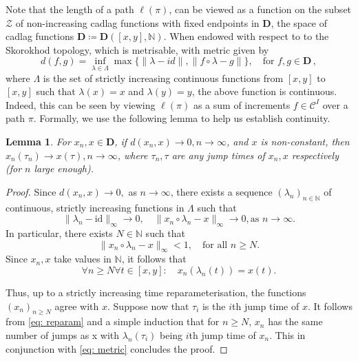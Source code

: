 \documentclass[12pt]{report}
\theoremstyle{plain}
\newtheorem{lemma}[theorem]{Lemma}
\newcommand{\N}{\ensuremath{\mathbb{N}}}
\begin{document}
Note that the length of a path \(\ell(\pi)\), can be viewed as a function on the subset \(\mathcal{Z}\) of non-increasing cadlag functions with fixed endpoints in \(\mathbf{D}\), the space of cadlag functions \(\mathbf{D}\coloneqq \mathbf{D}([x,y], \N)\). When endowed with respect to to the  Skorokhod topology, which is metrisable, with metric given by \[
d(f,g) = \displaystyle \inf_{\lambda\in \Lambda}\max\{\|\lambda-id\|,\|f\circ\lambda-g\|\}, \quad \text{for } f,g \in \mathbf{D}\,,
\] 
where \(\Lambda\) is the set of strictly increasing continuous functions from \([x,y]\) to \([x,y]\) such that \(\lambda(x) = x\) and \(\lambda(y) = y\), the above function is continuous. Indeed, this can be seen by viewing \(\ell(\pi)\) as a sum of increments \(f\in \mathcal{C}^I\) over a path \(\pi\). Formally, we use the following lemma to help us establish continuity. 

\begin{lemma}
    For \(x_n, x\in \mathbf{D}\), if \(d(x_n,x)\to 0, n\to \infty\), and \(x\) is non-constant, then \(x_n(\tau_n)\to x(\tau), n\to \infty\), where \(\tau_n, \tau\) are any jump times of \(x_n, x\) respectively (for \(n\) large enough). 
\end{lemma}

\begin{proof}
    Since \(d(x_n,x)\to 0,\) as \(n \to \infty\), there exists a sequence \((\lambda_n)_{n\in \N}\) of continuous, strictly increasing functions in \(\Lambda\) such that 
    \begin{equation}\label{eq: metric}
        \|\lambda_n-\text{id}\|_{\infty}\to 0, \quad \|x_n\circ\lambda_n-x\|_{\infty}\to 0, \text{as } n\to \infty.
    \end{equation}
    In particular, there exists \(N\in \N\) such that
    \[
    \|x_n\circ \lambda_n - x\|_{\infty}<1, \quad \text{for all } n\geq N.
    \]
    Since \(x_n, x\) take values in \(\N\), it follows that 
    \begin{equation}\label{eq: reparam}
        \forall n\geq N \forall t\in [x,y]: \quad  x_n(\lambda_n(t))= x(t).
    \end{equation}
    
\noindent Thus, up to a strictly increasing time reparameterisation, the functions \((x_n)_{n\geq N}\) agree with \(x\). Suppose now that \(\tau_i\) is the \(i\)th jump time of \(x\). It follows from \ref{eq: reparam} and a simple induction that for \(n\geq N\), \(x_n\) has the same number of jumps as x with \(\lambda_n(\tau_i)\) being \(i\)th jump time of \(x_n\). This in conjunction with \ref{eq: metric} concludes the proof.
\end{proof}
\end{document}

